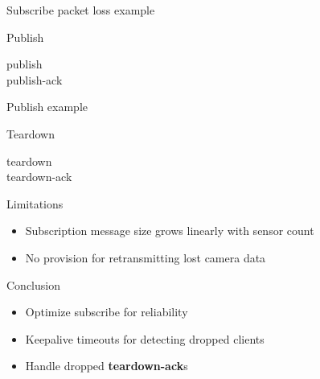 \documentclass{beamer}
\begin{document}
\begin{frame}{Subscribe packet loss example}
\begin{figure}
\end{figure}
\end{frame}

\begin{frame}{Publish}
\begin{description}
	\item[publish]
    \item[publish-ack]
\end{description}
\end{frame}

\begin{frame}{Publish example}
\begin{figure}
\end{figure}
\end{frame}

\begin{frame}{Teardown}
\begin{description}
	\item[teardown]
    \item[teardown-ack]
\end{description}
\end{frame}

\begin{frame}{Limitations}
\begin{itemize}
	\item Subscription message size grows linearly with sensor count
    \item No provision for retransmitting lost camera data
\end{itemize}
\end{frame}

\begin{frame}{Conclusion}
\begin{itemize}
	\item Optimize subscribe for reliability
    \item Keepalive timeouts for detecting dropped clients
    \item Handle dropped \textbf{teardown-ack}s
\end{itemize}
\end{frame}
\end{document}

